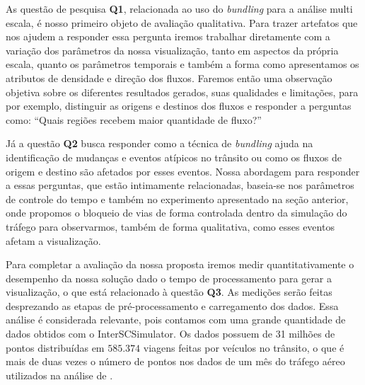   As questão de pesquisa \textbf{Q1}, relacionada ao uso do \emph{bundling} para a
análise multi escala, é nosso primeiro objeto de avaliação qualitativa. Para
trazer artefatos que nos ajudem a responder essa pergunta iremos trabalhar
diretamente com a variação dos parâmetros da nossa visualização, tanto em
aspectos da própria escala, quanto os parâmetros temporais e também a forma
como apresentamos os atributos de densidade e direção dos fluxos. Faremos então
uma observação objetiva sobre os diferentes resultados gerados, suas qualidades
e limitações, para por exemplo, distinguir as origens e destinos dos fluxos e
responder a perguntas como: ``Quais regiões recebem maior quantidade de
fluxo?''

  Já a questão \textbf{Q2} busca responder como a técnica de \emph{bundling}
ajuda na identificação de mudanças e eventos atípicos no trânsito ou como os
fluxos de origem e destino são afetados por esses eventos. Nossa abordagem para
responder a essas perguntas, que estão intimamente relacionadas, baseia-se nos
parâmetros de controle do tempo e também no experimento apresentado na seção
anterior, onde propomos o bloqueio de vias de forma controlada dentro da
simulação do tráfego para observarmos, também de forma qualitativa, como esses
eventos afetam a visualização.

  Para completar a avaliação da nossa proposta iremos medir quantitativamente o
desempenho da nossa solução dado o tempo de processamento para gerar a
visualização, o que está relacionado à questão \textbf{Q3}. As medições serão feitas
desprezando as etapas de pré-processamento e carregamento dos dados. Essa
análise é considerada relevante, pois contamos com uma grande quantidade de
dados obtidos com o InterSCSimulator. Os dados possuem de 31 milhões de pontos
distribuídas em $585.374$ viagens feitas por veículos no trânsito, o que é mais de
duas vezes o número de pontos nos dados de um mês do tráfego aéreo utilizados
na análise de \citet{Klein2013}.
